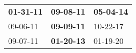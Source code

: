 \begin{supertabular}{p{0.33\columnwidth}p{0.33\columnwidth}p{0.33\columnwidth}}
 \textbf{01-31-11\textsuperscript{}} &  \textbf{09-08-11\textsuperscript{}} &  \textbf{05-04-14\textsuperscript{}} \\
          09-06-11\textsuperscript{} &  \textbf{09-09-11\textsuperscript{}} &           10-22-17\textsuperscript{} \\
          09-07-11\textsuperscript{} &  \textbf{01-20-13\textsuperscript{}} &           01-19-20\textsuperscript{} \\
\end{supertabular}
